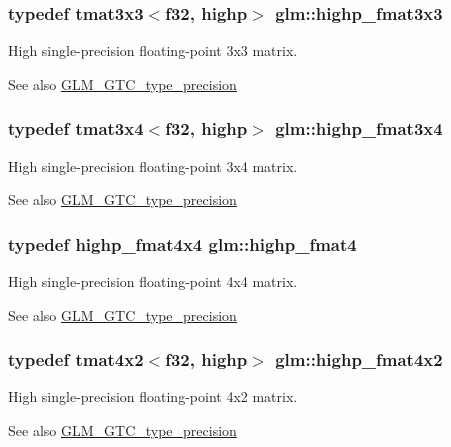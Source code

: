 \subsubsection[{highp\+\_\+fmat3x3}]{\setlength{\rightskip}{0pt plus 5cm}typedef tmat3x3$<${\bf f32}, highp$>$ {\bf glm\+::highp\+\_\+fmat3x3}}\label{namespaceglm_a3390aa5d7faf93394576070f3bd2c1e7}
High single-\/precision floating-\/point 3x3 matrix. \begin{DoxySeeAlso}{See also}
\hyperlink{group__gtc__type__precision}{G\+L\+M\+\_\+\+G\+T\+C\+\_\+type\+\_\+precision} 
\end{DoxySeeAlso}
\hypertarget{namespaceglm_a9447fb5acd76fe50d75dff7e9cc97b11}{}
\subsubsection[{highp\+\_\+fmat3x4}]{\setlength{\rightskip}{0pt plus 5cm}typedef tmat3x4$<${\bf f32}, highp$>$ {\bf glm\+::highp\+\_\+fmat3x4}}\label{namespaceglm_a9447fb5acd76fe50d75dff7e9cc97b11}
High single-\/precision floating-\/point 3x4 matrix. \begin{DoxySeeAlso}{See also}
\hyperlink{group__gtc__type__precision}{G\+L\+M\+\_\+\+G\+T\+C\+\_\+type\+\_\+precision} 
\end{DoxySeeAlso}
\hypertarget{namespaceglm_a4c7c9823ade7c29e29b5a313949ae502}{}
\subsubsection[{highp\+\_\+fmat4}]{\setlength{\rightskip}{0pt plus 5cm}typedef {\bf highp\+\_\+fmat4x4} {\bf glm\+::highp\+\_\+fmat4}}\label{namespaceglm_a4c7c9823ade7c29e29b5a313949ae502}
High single-\/precision floating-\/point 4x4 matrix. \begin{DoxySeeAlso}{See also}
\hyperlink{group__gtc__type__precision}{G\+L\+M\+\_\+\+G\+T\+C\+\_\+type\+\_\+precision} 
\end{DoxySeeAlso}
\hypertarget{namespaceglm_a313d7eb585bba68a553493a8768adc85}{}
\subsubsection[{highp\+\_\+fmat4x2}]{\setlength{\rightskip}{0pt plus 5cm}typedef tmat4x2$<${\bf f32}, highp$>$ {\bf glm\+::highp\+\_\+fmat4x2}}\label{namespaceglm_a313d7eb585bba68a553493a8768adc85}
High single-\/precision floating-\/point 4x2 matrix. \begin{DoxySeeAlso}{See also}
\hyperlink{group__gtc__type__precision}{G\+L\+M\+\_\+\+G\+T\+C\+\_\+type\+\_\+precision} 
\end{DoxySeeAlso}
\hypertarget{namespaceglm_a76d5f04bc31dec799810a4d9d9eb35d2}{}
